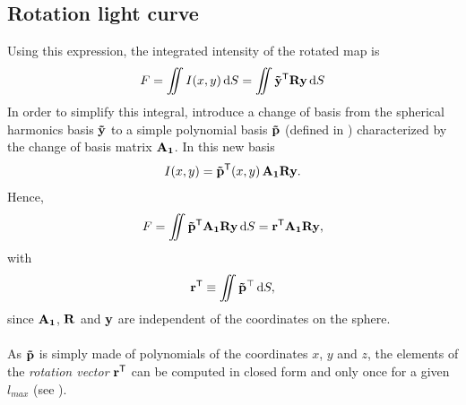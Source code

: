 \documentclass[modern]{aastex631}
\begin{document}
\subsection{Rotation light curve}
Using this expression, the integrated intensity of the rotated map is
\begin{equation}F = \iint I(x,y)\,\text{d}S = \iint \bvec{\tilde y^\mathsf{T}}\bvec{R}\bvec{y}\,\text{d}S\end{equation}
In order to simplify this integral, \citealt{starry} introduce a change of basis from the spherical harmonics basis ${\mathbf{\tilde y}}$ to a simple polynomial basis ${\mathbf{\tilde p}}$ (defined in \citealt[section 2.3]{starry}) characterized by the change of basis matrix ${\mathbf{A_1}}$. In this new basis 
\begin{equation}I(x, y) = \bvec{\tilde p^\mathsf{T}}(x, y)\,\bvec{A_1}\bvec{R}\bvec{y}.\end{equation}
Hence,
\begin{equation}F = \iint \bvec{\tilde p^\mathsf{T}}\bvec{A_1}\bvec{R}\bvec{y}\,\text{d}S = \bvec{r^\mathsf{T}}\bvec{A_1}\bvec{R}\bvec{y},\end{equation}
with
\begin{equation}\bvec{r^\mathsf{T}} \equiv \iint \mathbf{\tilde{p}}^\top\,\text{d}S,\end{equation}
since ${\mathbf{A_1}}$, ${\mathbf{R}}$ and ${\mathbf{y}}$ are independent of the coordinates on the sphere.\\\\
As ${\mathbf{\tilde{p}}}$ is simply made of polynomials of the coordinates $x$, $y$ and $z$, the elements of the \textit{rotation vector} ${\mathbf{r}}^\mathsf{T}$ can be computed in closed form and only once for a given $l_{max}$ (see \citealt[Eq. 20]{starry}).\\\\
\end{document}
